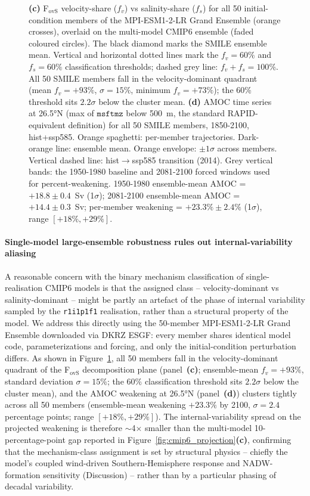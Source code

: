 \documentclass[11pt,a4paper]{article}
\begin{document}
\begin{figure}
{\textbf{(c)} F$_{\mathrm{ovS}}$ velocity-share ($f_v$) vs salinity-share ($f_s$) for all 50 initial-condition members of the MPI-ESM1-2-LR Grand Ensemble (orange crosses), overlaid on the multi-model CMIP6 ensemble (faded coloured circles). The black diamond marks the SMILE ensemble mean. Vertical and horizontal dotted lines mark the $f_v=60\%$ and $f_s=60\%$ classification thresholds; dashed grey line: $f_v+f_s=100\%$. All 50 SMILE members fall in the velocity-dominant quadrant (mean $f_v=+93\%$, $\sigma=15\%$, minimum $f_v=+73\%$); the 60\% threshold sits $2.2\sigma$ below the cluster mean.
\textbf{(d)} AMOC time series at 26.5°N (max of $\mathtt{msftmz}$ below 500~m, the standard RAPID-equivalent definition) for all 50 SMILE members, 1850-2100, hist+ssp585. Orange spaghetti: per-member trajectories. Dark-orange line: ensemble mean. Orange envelope: $\pm 1\sigma$ across members. Vertical dashed line: hist$\rightarrow$ssp585 transition (2014). Grey vertical bands: the 1950-1980 baseline and 2081-2100 forced windows used for percent-weakening. 1950-1980 ensemble-mean AMOC = $+18.8\pm 0.4$~Sv (1$\sigma$); 2081-2100 ensemble-mean AMOC = $+14.4\pm 0.3$~Sv; per-member weakening = $+23.3\%\pm 2.4\%$ (1$\sigma$), range $[+18\%,+29\%]$.}
\label{fig:f6_diagnostics}
\end{figure}

\paragraph*{Single-model large-ensemble robustness rules out internal-variability aliasing}

A reasonable concern with the binary mechanism classification of single-realisation CMIP6 models is that the assigned class -- velocity-dominant vs salinity-dominant -- might be partly an artefact of the phase of internal variability sampled by the \texttt{r1i1p1f1} realisation, rather than a structural property of the model. We address this directly using the 50-member MPI-ESM1-2-LR Grand Ensemble downloaded via DKRZ ESGF: every member shares identical model code, parameterizations and forcing, and only the initial-condition perturbation differs. As shown in Figure~\ref{fig:f6_diagnostics}, all 50 members fall in the velocity-dominant quadrant of the F$_{\mathrm{ovS}}$ decomposition plane (panel~\textbf{(c)}; ensemble-mean $f_v=+93\%$, standard deviation $\sigma=15\%$; the $60\%$ classification threshold sits $2.2\sigma$ below the cluster mean), and the AMOC weakening at 26.5°N (panel~\textbf{(d)}) clusters tightly across all 50 members (ensemble-mean weakening $+23.3\%$ by 2100, $\sigma=2.4$ percentage points; range $[+18\%,+29\%]$). The internal-variability spread on the projected weakening is therefore $\sim$4$\times$ smaller than the multi-model 10-percentage-point gap reported in Figure~\ref{fig:cmip6_projection}\textbf{(c)}, confirming that the mechanism-class assignment is set by structural physics -- chiefly the model's coupled wind-driven Southern-Hemisphere response and NADW-formation sensitivity (Discussion) -- rather than by a particular phasing of decadal variability.
\end{document}
